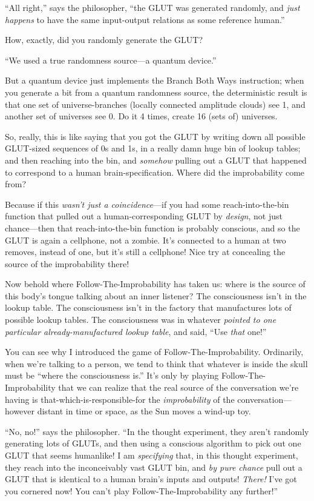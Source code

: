{
 ``All right,'' says the
philosopher, ``the GLUT was generated randomly, and
\textit{just happens} to have the same input-output relations as some
reference human.''}

{
 How, exactly, did you randomly generate the GLUT?}

{
 ``We used a true randomness source---a quantum
device.''}

{
 But a quantum device just implements the Branch Both Ways
instruction; when you generate a bit from a quantum randomness source,
the deterministic result is that one set of universe-branches (locally
connected amplitude clouds) see 1, and another set of universes see 0.
Do it 4 times, create 16 (sets of) universes.}

{
 So, really, this is like saying that you got the GLUT by writing
down all possible GLUT-sized sequences of 0s and 1s, in a really damn
huge bin of lookup tables; and then reaching into the bin, and
\textit{somehow} pulling out a GLUT that happened to correspond to a
human brain-specification. Where did the improbability come from?}

{
 Because if this \textit{wasn't just a
coincidence}{}---if you had some reach-into-the-bin function that
pulled out a human-corresponding GLUT by \textit{design}, not just
chance---then that reach-into-the-bin function is probably conscious,
and so the GLUT is again a cellphone, not a zombie.
It's connected to a human at two removes, instead of
one, but it's still a cellphone! Nice try at concealing
the source of the improbability there!}

{
 Now behold where Follow-The-Improbability has taken us: where is
the source of this body's tongue talking about an inner
listener? The consciousness isn't in the lookup table.
The consciousness isn't in the factory that
manufactures lots of possible lookup tables. The consciousness was in
whatever \textit{pointed to one particular already-manufactured lookup
table}, and said, ``Use \textit{that}
one!''}

{
 You can see why I introduced the game of Follow-The-Improbability.
Ordinarily, when we're talking to a person, we tend to
think that whatever is inside the skull must be
``where the consciousness is.''
It's only by playing Follow-The-Improbability that we
can realize that the real source of the conversation
we're having is that-which-is-responsible-for the
\textit{improbability} of the conversation---however distant in time or
space, as the Sun moves a wind-up toy.}

{
 ``No, no!'' says the
philosopher. ``In the thought experiment, they
aren't randomly generating lots of GLUTs, and then
using a conscious algorithm to pick out one GLUT that seems humanlike!
I am \textit{specifying} that, in this thought experiment, they reach
into the inconceivably vast GLUT bin, and \textit{by pure chance} pull
out a GLUT that is identical to a human brain's inputs
and outputs! \textit{There!} I've got you cornered now!
You can't play Follow-The-Improbability any
further!''}

